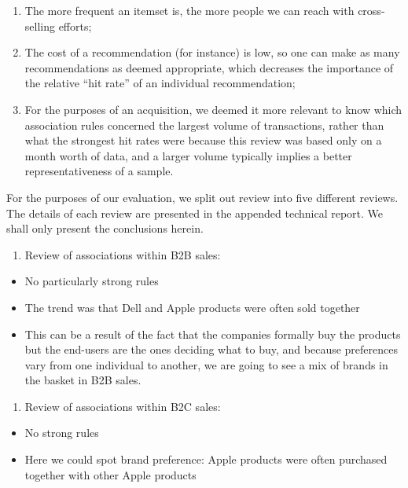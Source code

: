 \documentclass[]{article}
\providecommand{\tightlist}{%
  \setlength{\itemsep}{0pt}\setlength{\parskip}{0pt}}
\begin{document}
\begin{enumerate}
\def\labelenumi{\roman{enumi})}
\tightlist
\item
  The more frequent an itemset is, the more people we can reach with
  cross-selling efforts;
\item
  The cost of a recommendation (for instance) is low, so one can make as
  many recommendations as deemed appropriate, which decreases the
  importance of the relative ``hit rate'' of an individual
  recommendation;
\item
  For the purposes of an acquisition, we deemed it more relevant to know
  which association rules concerned the largest volume of transactions,
  rather than what the strongest hit rates were because this review was
  based only on a month worth of data, and a larger volume typically
  implies a better representativeness of a sample.
\end{enumerate}

For the purposes of our evaluation, we split out review into five
different reviews. The details of each review are presented in the
appended technical report. We shall only present the conclusions herein.

\begin{enumerate}
\def\labelenumi{\arabic{enumi}.}
\tightlist
\item
  Review of associations within B2B sales:
\end{enumerate}

\begin{itemize}
\tightlist
\item
  No particularly strong rules
\item
  The trend was that Dell and Apple products were often sold together
\item
  This can be a result of the fact that the companies formally buy the
  products but the end-users are the ones deciding what to buy, and
  because preferences vary from one individual to another, we are going
  to see a mix of brands in the basket in B2B sales.
\end{itemize}

\begin{enumerate}
\def\labelenumi{\arabic{enumi}.}
\setcounter{enumi}{1}
\tightlist
\item
  Review of associations within B2C sales:
\end{enumerate}

\begin{itemize}
\tightlist
\item
  No strong rules
\item
  Here we could spot brand preference: Apple products were often
  purchased together with other Apple products
\end{itemize}
\end{document}
